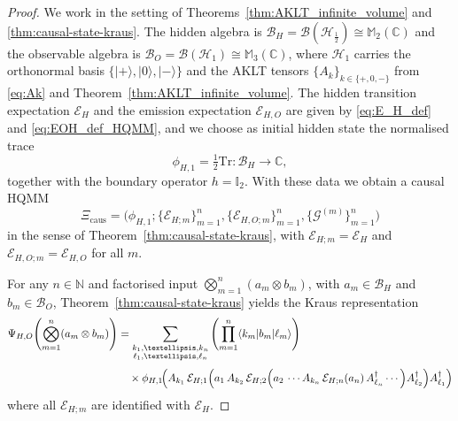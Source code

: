 \documentclass[10pt,a4paper]{amsart}
\def\Tr{\mathrm{Tr}}
\begin{document}
\begin{proof}
We work in the setting of Theorems~\ref{thm:AKLT_infinite_volume} and \ref{thm:causal-state-kraus}. The hidden algebra is $\mathcal{B}_H=\mathcal{B}(\mathcal{H}_{\frac{1}{2}})\cong\mathbb{M}_2(\mathbb{C})$ and the observable algebra is $\mathcal{B}_O=\mathcal{B}(\mathcal{H}_{1})\cong\mathbb{M}_3(\mathbb{C})$, where $\mathcal{H}_{1}$ carries the orthonormal basis $\{|+\rangle,|0\rangle,|-\rangle\}$ and the AKLT tensors $\{A_k\}_{k\in\{+,0,-\}}$ from \eqref{eq:Ak} and Theorem~\ref{thm:AKLT_infinite_volume}.  The hidden transition expectation $\mathcal{E}_H$ and the emission expectation $\mathcal{E}_{H,O}$ are given by \eqref{eq:E_H_def} and \eqref{eq:EOH_def_HQMM}, and we choose as initial hidden state the normalised trace
\[
\phi_{H,1}=\tfrac{1}{2}\Tr:\mathcal{B}_H\to\mathbb{C},
\]
together with the boundary operator $h=\mathbb{I}_2$. With these data we obtain a causal HQMM
\[
\Xi_{\mathrm{caus}}
=
\bigl(\phi_{H,1};\{\mathcal{E}_{H;m}\}_{m=1}^{n},\{\mathcal{E}_{H,O;m}\}_{m=1}^{n},\{\mathcal{G}^{(m)}\}_{m=1}^{n}\bigr)
\]
in the sense of Theorem~\ref{thm:causal-state-kraus}, with $\mathcal{E}_{H;m}=\mathcal{E}_H$ and $\mathcal{E}_{H,O;m}=\mathcal{E}_{H,O}$ for all $m$.

For any $n\in\mathbb{N}$ and factorised input $\bigotimes_{m=1}^n(a_m\otimes b_m)$, with $a_m\in\mathcal{B}_H$ and $b_m\in\mathcal{B}_O$, Theorem~\ref{thm:causal-state-kraus} yields the Kraus representation
\begin{align}
\Psi_{H,O}\!\left(\bigotimes_{m=1}^n (a_m\otimes b_m)\right)
&=
\sum_{\substack{k_1,\dots,k_n\\ \ell_1,\dots,\ell_n}}
\left(\prod_{m=1}^n \langle k_m|b_m|\ell_m\rangle\right)
\nonumber\\[0.3em]
&\quad\times
\phi_{H,1}\!\Bigl(
A_{k_1}\,
\mathcal{E}_{H;1}\Bigl(
a_1\,
A_{k_2}\,
\mathcal{E}_{H;2}\Bigl(
a_2\,
\cdots
A_{k_n}\,\mathcal{E}_{H;n}(a_n)\,
A_{\ell_n}^\dagger
\cdots
\Bigr)
A_{\ell_2}^\dagger
\Bigr)
A_{\ell_1}^\dagger
\Bigr)
\label{eq:psi-explicit-compact2-proof}
\end{align}
where all $\mathcal{E}_{H;m}$ are identified with $\mathcal{E}_H$.


\end{proof}
\end{document}
